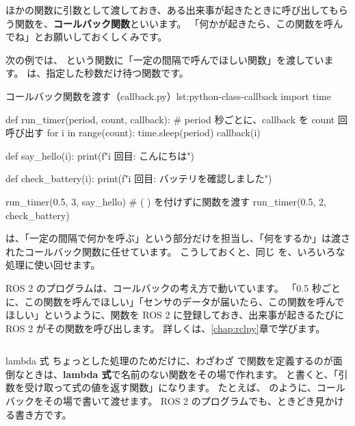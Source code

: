 ほかの関数に引数として渡しておき、ある出来事が起きたときに呼び出してもらう関数を、\textbf{コールバック関数}といいます。
「何かが起きたら、この関数を呼んでね」とお願いしておくしくみです。

次の例では、 という関数に「一定の間隔で呼んでほしい関数」を渡しています。
 は、指定した秒数だけ待つ関数です。

\begin{codelisting}[style=python]{コールバック関数を渡す（callback.py）}{lst:python-class-callback}
import time


def run_timer(period, count, callback):
    # period 秒ごとに、callback を count 回呼び出す
    for i in range(count):
        time.sleep(period)
        callback(i)


def say_hello(i):
    print(f"{i} 回目: こんにちは")


def check_battery(i):
    print(f"{i} 回目: バッテリを確認しました")


run_timer(0.5, 3, say_hello)       # ( ) を付けずに関数を渡す
run_timer(0.5, 2, check_battery)
\end{codelisting}


 は、「一定の間隔で何かを呼ぶ」という部分だけを担当し、「何をするか」は渡されたコールバック関数に任せています。
こうしておくと、同じ  を、いろいろな処理に使い回せます。

\begin{point}
  ROS 2 のプログラムは、コールバックの考え方で動いています。
  「0.5 秒ごとに、この関数を呼んでほしい」「センサのデータが届いたら、この関数を呼んでほしい」というように、関数を ROS 2 に登録しておき、出来事が起きるたびに ROS 2 がその関数を呼び出します。
  詳しくは、\ref{chap:rclpy}章で学びます。
\end{point}

\begin{column}{lambda 式}
  ちょっとした処理のためだけに、わざわざ  で関数を定義するのが面倒なときは、\textbf{lambda 式}で名前のない関数をその場で作れます。
   と書くと、「引数を受け取って式の値を返す関数」になります。
  たとえば、 のように、コールバックをその場で書いて渡せます。
  ROS 2 のプログラムでも、ときどき見かける書き方です。
\end{column}


